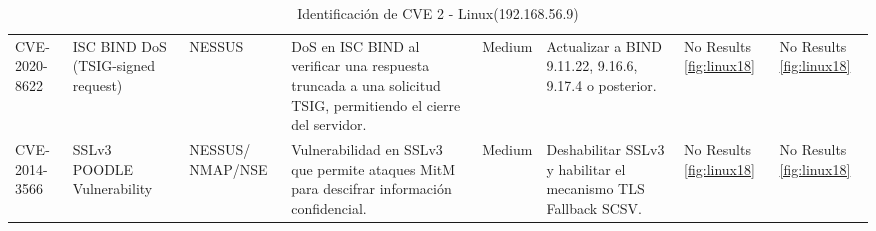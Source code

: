 \documentclass[a4paper,12pt]{article} %
\begin{document}
\begin{table}[hp!]
{\begin{tabular}{m{2.1cm}|m{2.6cm}|m{2cm}|m{4cm}|m{1cm}|m{3cm}|m{5cm}|m{5cm}}
  {CVE-2020-8622} & {ISC BIND DoS (TSIG-signed request)} & {NESSUS} & {DoS en ISC BIND al verificar una respuesta truncada a una solicitud TSIG, permitiendo el cierre del servidor.} & {Medium} & {Actualizar a BIND 9.11.22, 9.16.6, 9.17.4 o posterior.} & {No Results \ref{fig:linux18}}  & {No Results \ref{fig:linux18}}\\
  {CVE-2014-3566} & {SSLv3 POODLE Vulnerability} & {NESSUS/ NMAP/NSE} & {Vulnerabilidad en SSLv3 que permite ataques MitM para descifrar información confidencial.} & {Medium} & {Deshabilitar SSLv3 y habilitar el mecanismo TLS Fallback SCSV.} & {No Results \ref{fig:linux18}}  & {No Results \ref{fig:linux18}}\\

  \end{tabular}}
  \caption{Identificación de CVE 2 - Linux(192.168.56.9)}
  \label{tab:linux2}
\end{table}
\end{document}
